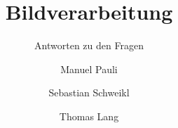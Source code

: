 
\usepackage[pdftex]{graphicx}  
\usepackage{listings}

\newcommand{\INT}[1]{\text{d#1}}
\newcommand{\INTM}[1]{\text{d} #1}
\newcommand{\INTMM}[2]{\text{d#1}_{#2}}
\renewcommand{\T}[1]{\text{#1 }}
\newcommand{\DIFF}[2]{\frac{\INT{#1}}{\INT{#2}}}
\renewcommand{\theta}{\vartheta}




\title{Bildverarbeitung}
\subtitle{Antworten zu den Fragen}
\author{Manuel Pauli\and{}Sebastian Schweikl\and{}Thomas Lang}

\maketitle
